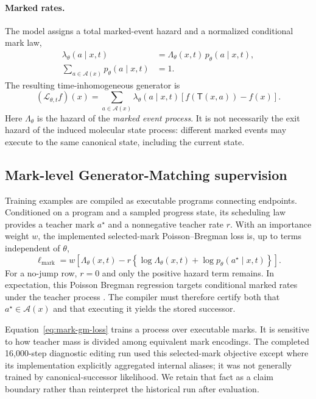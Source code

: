 \documentclass[10pt,letterpaper]{article}
\newcommand{\A}{\mathcal{A}}
\newcommand{\T}{\mathsf{T}}
\begin{document}
\paragraph{Marked rates.}
The model assigns a total marked-event hazard and a normalized conditional
mark law,
\begin{align}
  \lambda_\theta(a\mid x,t)
  &=
  \Lambda_\theta(x,t)\,p_\theta(a\mid x,t),
  \label{eq:marked-rate}\\
  \sum_{a\in\A(x)}p_\theta(a\mid x,t)
  &=1.
\end{align}
The resulting time-inhomogeneous generator is
\begin{equation}
  (\mathcal L_{\theta,t}f)(x)
  =
  \sum_{a\in\A(x)}
  \lambda_\theta(a\mid x,t)
  \left[f(\T(x,a))-f(x)\right].
  \label{eq:marked-generator}
\end{equation}
Here $\Lambda_\theta$ is the hazard of the \emph{marked event process}. It is
not necessarily the exit hazard of the induced molecular state process:
different marked events may execute to the same canonical state, including
the current state.

\subsection{Mark-level Generator-Matching supervision}
\label{sec:mark-gm}

Training examples are compiled as executable programs connecting endpoints.
Conditioned on a program and a sampled progress state, its scheduling law
provides a teacher mark $a^\star$ and a nonnegative teacher rate $r$. With an
importance weight $w$, the implemented selected-mark Poisson--Bregman loss is,
up to terms independent of $\theta$,
\begin{equation}
  \ell_{\mathrm{mark}}
  =
  w\left[
    \Lambda_\theta(x,t)
    -
    r\left\{
      \log\Lambda_\theta(x,t)
      +
      \log p_\theta(a^\star\mid x,t)
    \right\}
  \right].
  \label{eq:mark-gm-loss}
\end{equation}
For a no-jump row, $r=0$ and only the positive hazard term remains. In
expectation, this Poisson Bregman regression targets conditional marked rates
under the teacher process \citep{holderrieth2025generator}. The compiler must
therefore certify both that $a^\star\in\A(x)$ and that executing it yields the
stored successor.

Equation~\eqref{eq:mark-gm-loss} trains a process over executable marks. It is
sensitive to how teacher mass is divided among equivalent mark encodings. The
completed 16,000-step diagnostic editing run used this selected-mark objective
except where its implementation explicitly aggregated internal aliases; it
was not generally trained by canonical-successor likelihood. We retain that
fact as a claim boundary rather than reinterpret the historical run after
evaluation.
\end{document}
